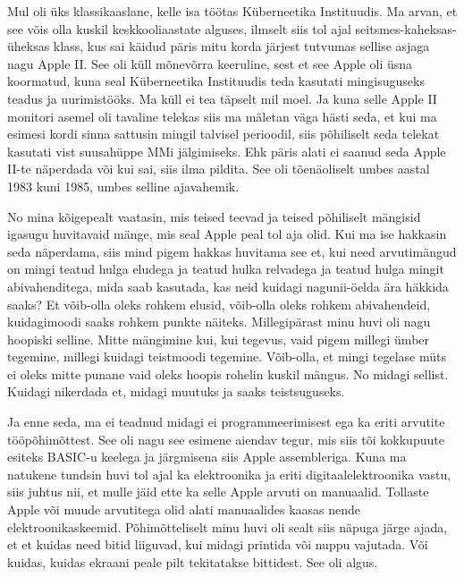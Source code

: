 




Mul oli üks klassikaaslane, kelle isa töötas Küberneetika Instituudis. Ma arvan, et see võis olla kuskil keskkooliaastate alguses, ilmselt siis tol ajal seitsmes-kaheksas-üheksas klass, kus sai käidud päris mitu korda järjest tutvumas sellise asjaga nagu Apple II. See oli küll mõnevõrra keeruline, sest et see Apple oli üsna koormatud, kuna seal Küberneetika Instituudis teda kasutati mingisuguseks teadus ja uurimistööks. Ma küll ei tea täpselt mil moel. Ja kuna selle Apple II monitori asemel oli tavaline telekas siis ma mäletan väga hästi seda, et kui ma esimesi kordi sinna sattusin mingil talvisel perioodil, siis põhiliselt seda telekat kasutati vist suusahüppe MMi jälgimiseks. Ehk päris alati ei saanud seda Apple II-te näperdada  või kui sai, siis ilma pildita. See oli  tõenäoliselt umbes aastal 1983 kuni 1985, umbes selline ajavahemik. 


No mina kõigepealt vaatasin, mis teised teevad ja teised põhiliselt mängisid igasugu huvitavaid mänge, mis seal Apple peal tol aja olid. Kui ma ise hakkasin seda näperdama, siis mind pigem hakkas huvitama see et, kui need arvutimängud on mingi teatud hulga eludega ja teatud hulka relvadega ja teatud hulga mingit abivahenditega, mida saab kasutada, kas neid kuidagi nagunii-öelda ära häkkida saaks? Et võib-olla oleks rohkem elusid,  võib-olla oleks rohkem abivahendeid, kuidagimoodi saaks rohkem punkte näiteks. Millegipärast minu huvi oli nagu hoopiski selline. Mitte  mängimine kui, kui tegevus, vaid pigem millegi ümber tegemine, millegi kuidagi teistmoodi tegemine. Võib-olla, et mingi tegelase müts ei oleks mitte punane vaid oleks hoopis rohelin kuskil mängus. No midagi sellist. Kuidagi  nikerdada  et, midagi muutuks ja saaks teistsuguseks. 

Ja enne seda, ma ei teadnud midagi ei programmeerimisest ega ka eriti arvutite tööpõhimõttest. See oli nagu see esimene aiendav tegur, mis siis tõi kokkupuute esiteks BASIC-u keelega ja järgmisena siis Apple assembleriga. Kuna ma natukene tundsin huvi tol ajal ka elektroonika ja eriti digitaalelektroonika vastu, siis juhtus nii, et mulle jäid ette ka selle Apple arvuti on manuaalid. Tollaste Apple või muude arvutitega olid alati manuaalides kaasas nende elektroonikaskeemid. Põhimõtteliselt minu huvi oli sealt siis  näpuga järge ajada, et et kuidas need bitid liiguvad, kui midagi printida või nuppu vajutada. Või kuidas, kuidas ekraani peale pilt tekitatakse bittidest. See oli algus.

